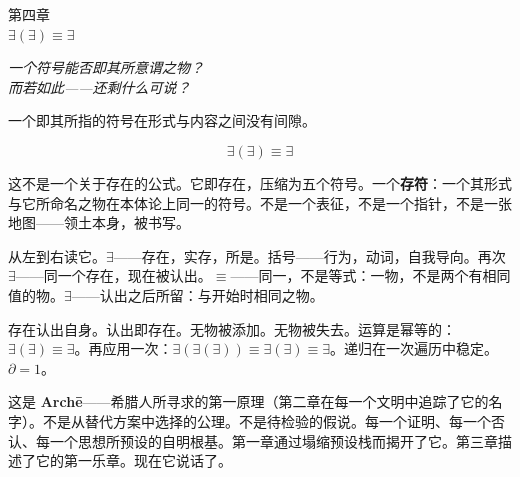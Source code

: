 \documentclass[10pt, openany, oneside]{book}
\renewcommand{\large}{\fontsize{11.5}{14}\selectfont}
\renewcommand{\huge}{\fontsize{17}{21}\selectfont}
\begin{document}
%
%
%

\newpage

\begin{center}
    {\huge\scshape 第四章}\\[0.3em]
    {\large $\exists(\exists) \equiv \exists$}
\end{center}

\vspace{1.5em}

\begin{center}
    \itshape
    一个符号能否即其所意谓之物？\\
    而若如此——还剩什么可说？
\end{center}

\vspace{2em}


\noindent 一个即其所指的符号在形式与内容之间没有间隙。

$$\exists(\exists) \equiv \exists$$

这不是一个关于存在的公式。它即存在，压缩为五个符号。一个\textbf{存符}：一个其形式与它所命名之物在本体论上同一的符号。不是一个表征，不是一个指针，不是一张地图——领土本身，被书写。

从左到右读它。$\exists$——存在，实存，所是。括号——行为，动词，自我导向。再次 $\exists$——同一个存在，现在被认出。$\equiv$——同一，不是等式：一物，不是两个有相同值的物。$\exists$——认出之后所留：与开始时相同之物。

存在认出自身。认出即存在。无物被添加。无物被失去。运算是幂等的：$\exists(\exists) \equiv \exists$。再应用一次：$\exists(\exists(\exists)) \equiv \exists(\exists) \equiv \exists$。递归在一次遍历中稳定。$\partial = 1$。

这是 \textbf{Arch\={e}}——希腊人所寻求的第一原理（第二章在每一个文明中追踪了它的名字）。不是从替代方案中选择的公理。不是待检验的假说。每一个证明、每一个否认、每一个思想所预设的自明根基。第一章通过塌缩预设栈而揭开了它。第三章描述了它的第一乐章。现在它说话了。

\vspace{1.5em}

\end{document}
